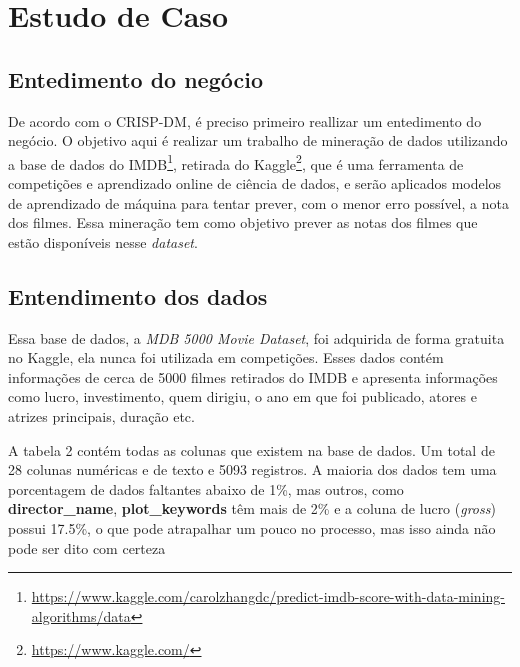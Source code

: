 \section{Estudo de Caso}
\subsection{Entedimento do negócio}
De acordo com o CRISP-DM, é preciso primeiro reallizar um entedimento do negócio.
O objetivo aqui é realizar um trabalho de mineração de dados utilizando a base de dados do IMDB\footnote{\url{https://www.kaggle.com/carolzhangdc/predict-imdb-score-with-data-mining-algorithms/data}}, retirada do Kaggle\footnote{\url{https://www.kaggle.com/}}, que é uma ferramenta de competições e aprendizado online de ciência de dados, e serão aplicados modelos de aprendizado de máquina para tentar prever, com o menor erro possível, a nota dos filmes. Essa mineração tem como objetivo prever as notas dos filmes que estão disponíveis nesse \textit{dataset}. 

\subsection{Entendimento dos dados}
Essa base de dados, a \textit{MDB 5000 Movie Dataset}, foi adquirida de forma gratuita no Kaggle, ela nunca foi utilizada em competições. Esses dados contém informações de cerca de 5000 filmes retirados do IMDB e apresenta informações como lucro, investimento, quem dirigiu, o ano em que foi publicado, atores e atrizes principais, duração etc.

A tabela 2 contém todas as colunas que existem na base de dados. Um total de 28 colunas numéricas e de texto e 5093 registros. A maioria dos dados tem uma porcentagem de dados faltantes abaixo de 1\%, mas outros, como \textbf{director\_name}, \textbf{plot\_keywords} têm mais de 2\% e a coluna de lucro (\textit{gross}) possui 17.5\%, o que pode atrapalhar um pouco no processo, mas isso ainda não pode ser dito com certeza


